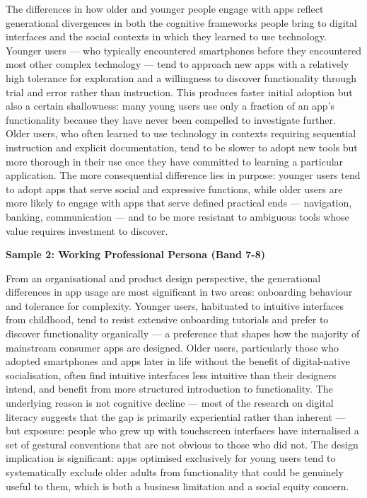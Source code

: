 The differences in how older and younger people engage with apps reflect generational divergences in both the cognitive frameworks people bring to digital interfaces and the social contexts in which they learned to use technology. Younger users — who typically encountered smartphones before they encountered most other complex technology — tend to approach new apps with a relatively high tolerance for exploration and a willingness to discover functionality through trial and error rather than instruction. This produces faster initial adoption but also a certain shallowness: many young users use only a fraction of an app's functionality because they have never been compelled to investigate further. Older users, who often learned to use technology in contexts requiring sequential instruction and explicit documentation, tend to be slower to adopt new tools but more thorough in their use once they have committed to learning a particular application. The more consequential difference lies in purpose: younger users tend to adopt apps that serve social and expressive functions, while older users are more likely to engage with apps that serve defined practical ends — navigation, banking, communication — and to be more resistant to ambiguous tools whose value requires investment to discover.

\textbf{Sample 2: Working Professional Persona (Band 7-8)}

From an organisational and product design perspective, the generational differences in app usage are most significant in two areas: onboarding behaviour and tolerance for complexity. Younger users, habituated to intuitive interfaces from childhood, tend to resist extensive onboarding tutorials and prefer to discover functionality organically — a preference that shapes how the majority of mainstream consumer apps are designed. Older users, particularly those who adopted smartphones and apps later in life without the benefit of digital-native socialisation, often find intuitive interfaces less intuitive than their designers intend, and benefit from more structured introduction to functionality. The underlying reason is not cognitive decline — most of the research on digital literacy suggests that the gap is primarily experiential rather than inherent — but exposure: people who grew up with touchscreen interfaces have internalised a set of gestural conventions that are not obvious to those who did not. The design implication is significant: apps optimised exclusively for young users tend to systematically exclude older adults from functionality that could be genuinely useful to them, which is both a business limitation and a social equity concern.

